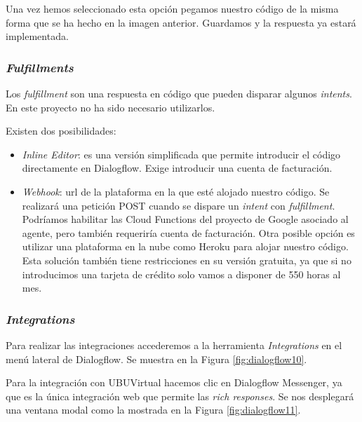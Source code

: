 Una vez hemos seleccionado esta opción pegamos nuestro código de la misma forma que se ha hecho en la imagen anterior. Guardamos y la respuesta ya estará implementada.

\newpage
\subsubsection{\textit{Fulfillments}}

Los \textit{fulfillment} son una respuesta en código que pueden disparar algunos \textit{intents}. En este proyecto no ha sido necesario utilizarlos. 


Existen dos posibilidades:

\begin{itemize}
	\tightlist
	\item 
	\textit{Inline Editor}: es una versión simplificada que permite introducir el código directamente en Dialogflow. Exige introducir una cuenta de facturación.
	\item	
	\textit{Webhook}: url de la plataforma en la que esté alojado nuestro código. Se realizará una petición POST cuando se dispare un \textit{intent} con \textit{fulfillment}. Podríamos habilitar las Cloud Functions del proyecto de Google asociado al agente, pero también requeriría cuenta de facturación. Otra posible opción es utilizar una plataforma en la nube como Heroku para alojar nuestro código. Esta solución también tiene restricciones en su versión gratuita, ya que si no introducimos una tarjeta de crédito solo vamos a disponer de 550 horas al mes. \cite{heroku}
\end{itemize}

\subsubsection{\textit{Integrations}}

Para realizar las integraciones accederemos a la herramienta \textit{Integrations} en el menú lateral de Dialogflow. Se muestra en la Figura \ref{fig:dialogflow10}.

Para la integración con UBUVirtual hacemos clic en Dialogflow Messenger, ya que es la única integración web que permite las \textit{rich responses}. Se nos desplegará una ventana modal como la mostrada en la Figura \ref{fig:dialogflow11}.

